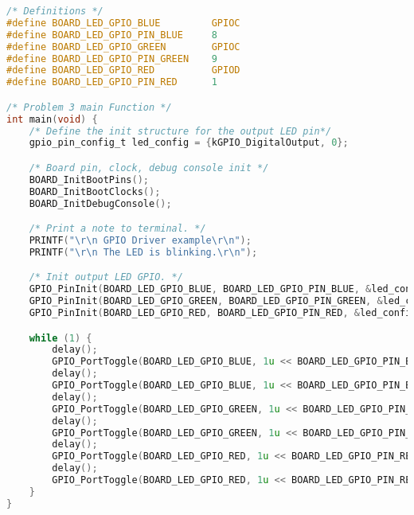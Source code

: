 \begin{lstlisting}[language=c,caption=Problem 3, label=list:p3]
/* Definitions */
#define BOARD_LED_GPIO_BLUE    	 	GPIOC
#define BOARD_LED_GPIO_PIN_BLUE	 	8
#define BOARD_LED_GPIO_GREEN     	GPIOC
#define BOARD_LED_GPIO_PIN_GREEN 	9
#define BOARD_LED_GPIO_RED     		GPIOD
#define BOARD_LED_GPIO_PIN_RED		1

/* Problem 3 main Function */
int main(void) {
    /* Define the init structure for the output LED pin*/
    gpio_pin_config_t led_config = {kGPIO_DigitalOutput, 0};

    /* Board pin, clock, debug console init */
    BOARD_InitBootPins();
    BOARD_InitBootClocks();
    BOARD_InitDebugConsole();

    /* Print a note to terminal. */
    PRINTF("\r\n GPIO Driver example\r\n");
    PRINTF("\r\n The LED is blinking.\r\n");

    /* Init output LED GPIO. */
    GPIO_PinInit(BOARD_LED_GPIO_BLUE, BOARD_LED_GPIO_PIN_BLUE, &led_config);
    GPIO_PinInit(BOARD_LED_GPIO_GREEN, BOARD_LED_GPIO_PIN_GREEN, &led_config);
    GPIO_PinInit(BOARD_LED_GPIO_RED, BOARD_LED_GPIO_PIN_RED, &led_config);

    while (1) {
        delay();
        GPIO_PortToggle(BOARD_LED_GPIO_BLUE, 1u << BOARD_LED_GPIO_PIN_BLUE);
        delay();
        GPIO_PortToggle(BOARD_LED_GPIO_BLUE, 1u << BOARD_LED_GPIO_PIN_BLUE);
        delay();
        GPIO_PortToggle(BOARD_LED_GPIO_GREEN, 1u << BOARD_LED_GPIO_PIN_GREEN);
        delay();
        GPIO_PortToggle(BOARD_LED_GPIO_GREEN, 1u << BOARD_LED_GPIO_PIN_GREEN);
        delay();
        GPIO_PortToggle(BOARD_LED_GPIO_RED, 1u << BOARD_LED_GPIO_PIN_RED);
        delay();
        GPIO_PortToggle(BOARD_LED_GPIO_RED, 1u << BOARD_LED_GPIO_PIN_RED);
    }
}
\end{lstlisting}